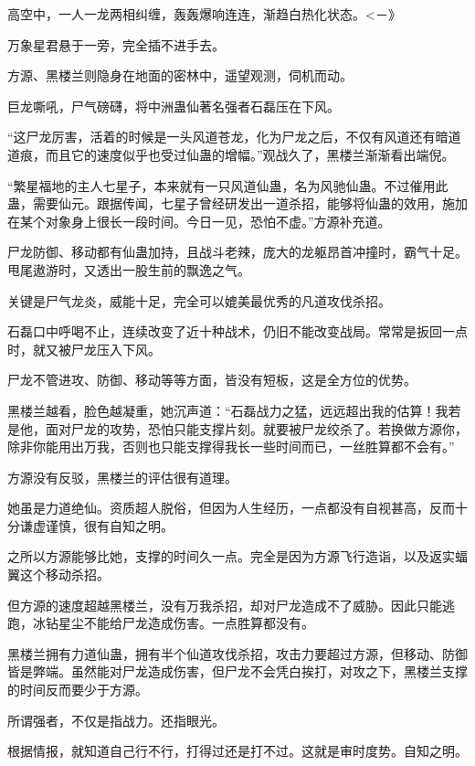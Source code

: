 
\begin{this_body}

高空中，一人一龙两相纠缠，轰轰爆响连连，渐趋白热化状态。<－》

万象星君悬于一旁，完全插不进手去。

方源、黑楼兰则隐身在地面的密林中，遥望观测，伺机而动。

巨龙嘶吼，尸气磅礴，将中洲蛊仙著名强者石磊压在下风。

“这尸龙厉害，活着的时候是一头风道苍龙，化为尸龙之后，不仅有风道还有暗道道痕，而且它的速度似乎也受过仙蛊的增幅。”观战久了，黑楼兰渐渐看出端倪。

“繁星福地的主人七星子，本来就有一只风道仙蛊，名为风驰仙蛊。不过催用此蛊，需要仙元。跟据传闻，七星子曾经研发出一道杀招，能够将仙蛊的效用，施加在某个对象身上很长一段时间。今日一见，恐怕不虚。”方源补充道。

尸龙防御、移动都有仙蛊加持，且战斗老辣，庞大的龙躯昂首冲撞时，霸气十足。甩尾遨游时，又透出一股生前的飘逸之气。

关键是尸气龙炎，威能十足，完全可以媲美最优秀的凡道攻伐杀招。

石磊口中呼喝不止，连续改变了近十种战术，仍旧不能改变战局。常常是扳回一点时，就又被尸龙压入下风。

尸龙不管进攻、防御、移动等等方面，皆没有短板，这是全方位的优势。

黑楼兰越看，脸色越凝重，她沉声道：“石磊战力之猛，远远超出我的估算！我若是他，面对尸龙的攻势，恐怕只能支撑片刻。就要被尸龙绞杀了。若换做方源你，除非你能用出万我，否则也只能支撑得我长一些时间而已，一丝胜算都不会有。”

方源没有反驳，黑楼兰的评估很有道理。

她虽是力道绝仙。资质超人脱俗，但因为人生经历，一点都没有自视甚高，反而十分谦虚谨慎，很有自知之明。

之所以方源能够比她，支撑的时间久一点。完全是因为方源飞行造诣，以及返实蝠翼这个移动杀招。

但方源的速度超越黑楼兰，没有万我杀招，却对尸龙造成不了威胁。因此只能逃跑，冰钻星尘不能给尸龙造成伤害。一点胜算都没有。

黑楼兰拥有力道仙蛊，拥有半个仙道攻伐杀招，攻击力要超过方源，但移动、防御皆是弊端。虽然能对尸龙造成伤害，但尸龙不会凭白挨打，对攻之下，黑楼兰支撑的时间反而要少于方源。

所谓强者，不仅是指战力。还指眼光。

根据情报，就知道自己行不行，打得过还是打不过。这就是审时度势。自知之明。


\end{this_body}
